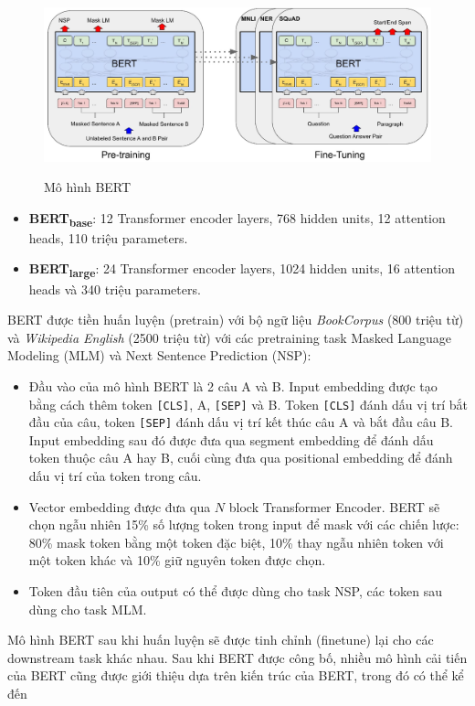 \begin{figure}
\centering
\resizebox{\textwidth}{!}
{\includegraphics{img/BERT.jpg}}
\caption{Mô hình BERT\cite{devlin-etal-2019-bert}}
\label{fig:my_label}
\end{figure}
\begin{itemize}
\item \textbf{BERT\textsubscript{base}}: 12 Transformer encoder layers, 768 hidden units, 12 attention heads, 110 triệu parameters.
\item \textbf{BERT\textsubscript{large}}: 24 Transformer encoder layers, 1024 hidden units, 16 attention heads và 340 triệu parameters.
\end{itemize}
BERT được tiền huấn luyện (pretrain) với bộ ngữ liệu \textit{BookCorpus} (800 triệu từ) và \textit{Wikipedia English} (2500 triệu từ) với các pretraining task Masked Language Modeling (MLM) và Next Sentence Prediction (NSP):
\begin{itemize}
\item Đầu vào của mô hình BERT là 2 câu A và B. Input embedding được tạo bằng cách thêm token \texttt{[CLS]}, A, \texttt{[SEP]} và B. Token \texttt{[CLS]} đánh dấu vị trí bắt đầu của câu, token \texttt{[SEP]} đánh dấu vị trí kết thúc câu A và bắt đầu câu B. Input embedding sau đó được đưa qua segment embedding để đánh dấu token thuộc câu A hay B, cuối cùng đưa qua positional embedding để đánh dấu vị trí của token trong câu.
\item Vector embedding được đưa qua $N$ block Transformer Encoder. BERT sẽ chọn ngẫu nhiên 15\% số lượng token trong input để mask với các chiến lược: 80\% mask token bằng một token đặc biệt, 10\% thay ngẫu nhiên token với một token khác và 10\% giữ nguyên token được chọn.
\item Token đầu tiên của output có thể được dùng cho task NSP, các token sau dùng cho task MLM.
\end{itemize}

Mô hình BERT sau khi huấn luyện sẽ được tinh chỉnh (finetune) lại cho các downstream task khác nhau. Sau khi BERT được công bố, nhiều mô hình cải tiến của BERT cũng được giới thiệu dựa trên kiến trúc của BERT, trong đó có thể kể đến

